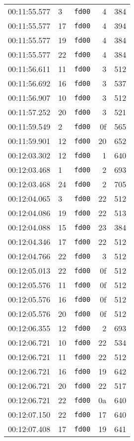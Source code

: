 \documentclass{article}
\begin{document}
\begin{longtable}{lllrr}
00:11:55.577 & 3 & \texttt{fd00} & 4 & 384 \\
00:11:55.577 & 17 & \texttt{fd00} & 4 & 394 \\
00:11:55.577 & 19 & \texttt{fd00} & 4 & 384 \\
00:11:55.577 & 22 & \texttt{fd00} & 4 & 384 \\
00:11:56.611 & 11 & \texttt{fd00} & 3 & 512 \\
00:11:56.692 & 16 & \texttt{fd00} & 3 & 537 \\
00:11:56.907 & 10 & \texttt{fd00} & 3 & 512 \\
00:11:57.252 & 20 & \texttt{fd00} & 3 & 521 \\
00:11:59.549 & 2 & \texttt{fd00} & 0f & 565 \\
00:11:59.901 & 12 & \texttt{fd00} & 20 & 652 \\
00:12:03.302 & 12 & \texttt{fd00} & 1 & 640 \\
00:12:03.468 & 1 & \texttt{fd00} & 2 & 693 \\
00:12:03.468 & 24 & \texttt{fd00} & 2 & 705 \\
00:12:04.065 & 3 & \texttt{fd00} & 22 & 512 \\
00:12:04.086 & 19 & \texttt{fd00} & 22 & 513 \\
00:12:04.088 & 15 & \texttt{fd00} & 23 & 384 \\
00:12:04.346 & 17 & \texttt{fd00} & 22 & 512 \\
00:12:04.766 & 22 & \texttt{fd00} & 3 & 512 \\
00:12:05.013 & 22 & \texttt{fd00} & 0f & 512 \\
00:12:05.576 & 11 & \texttt{fd00} & 0f & 512 \\
00:12:05.576 & 16 & \texttt{fd00} & 0f & 512 \\
00:12:05.576 & 20 & \texttt{fd00} & 0f & 512 \\
00:12:06.355 & 12 & \texttt{fd00} & 2 & 693 \\
00:12:06.721 & 10 & \texttt{fd00} & 22 & 534 \\
00:12:06.721 & 11 & \texttt{fd00} & 22 & 512 \\
00:12:06.721 & 16 & \texttt{fd00} & 19 & 642 \\
00:12:06.721 & 20 & \texttt{fd00} & 22 & 517 \\
00:12:06.721 & 22 & \texttt{fd00} & 0a & 640 \\
00:12:07.150 & 22 & \texttt{fd00} & 17 & 640 \\
00:12:07.408 & 17 & \texttt{fd00} & 19 & 641 \\

\end{longtable}
\end{document}
